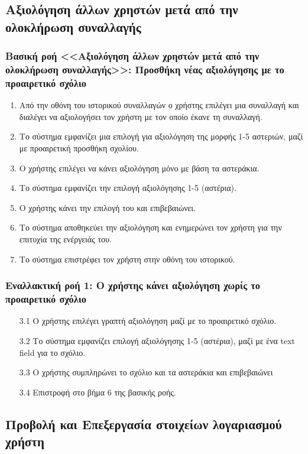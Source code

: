 \documentclass[12pt,a4paper]{article}
\begin{document}
\subsection{Αξιολόγηση άλλων χρηστών μετά από την ολοκλήρωση συναλλαγής}

\subsubsection*{Βασική ροή <<Αξιολόγηση άλλων χρηστών μετά από την ολοκλήρωση συναλλαγής>>: Προσθήκη νέας αξιολόγησης με το προαιρετικό σχόλιο}
\begin{enumerate}
    \item Από την οθόνη του ιστορικού συναλλαγών ο χρήστης επιλέγει μια συναλλαγή και διαλέγει να αξιολογήσει τον χρήστη με τον οποίο έκανε τη συναλλαγή. 
    \item Το σύστημα εμφανίζει μια επιλογή για αξιολόγηση της μορφής 1-5 αστεριών, μαζί με προαιρετική προσθήκη σχολίου. 
    \item Ο χρήστης επιλέγει να κάνει αξιολόγηση μόνο με βάση τα αστεράκια. 
    \item Το σύστημα εμφανίζει την επιλογή αξιολόγησης 1-5 (αστέρια). 
    \item Ο χρήστης κάνει την επιλογή του και επιβεβαιώνει.
    \item Το σύστημα αποθηκεύει την αξιολόγηση και ενημερώνει τον χρήστη για την επιτυχία της ενέργειάς του.
    \item Το σύστημα επιστρέφει τον χρήστη στην οθόνη του ιστορικού.
\end{enumerate}

\subsubsection*{Εναλλακτική ροή 1: Ο χρήστης κάνει αξιολόγηση χωρίς το προαιρετικό σχόλιο}
\begin{enumerate}
    \item[3.1] Ο χρήστης επιλέγει γραπτή αξιολόγηση μαζί με το προαιρετικό σχόλιο. 
    \item[3.2] Το σύστημα εμφανίζει επιλογή αξιολόγησης 1-5 (αστέρια), μαζί με ένα text field για το σχόλιο. 
    \item[3.3] Ο χρήστης συμπληρώνει το σχόλιο και τα αστεράκια και επιβεβαιώνει
    \item[3.4] Επιστροφή στο βήμα 6 της βασικής ροής.
\end{enumerate}

\subsection{Προβολή και Επεξεργασία στοιχείων λογαριασμού χρήστη}
\end{document}

